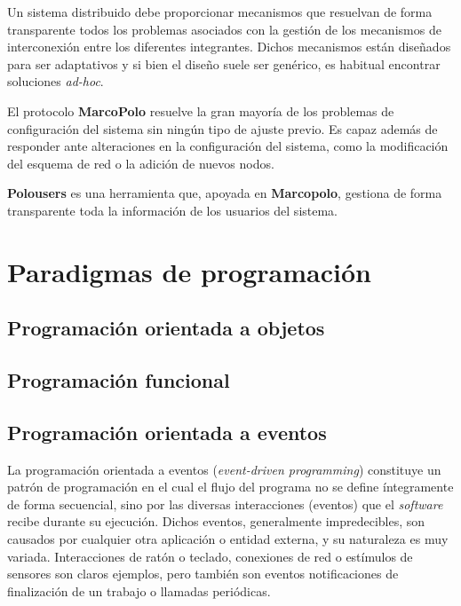 Un sistema distribuido debe proporcionar mecanismos que resuelvan de forma transparente todos los problemas asociados con la gestión de los mecanismos de interconexión entre los diferentes integrantes. Dichos mecanismos están diseñados para ser adaptativos y si bien el diseño suele ser genérico, es habitual encontrar soluciones \textit{ad-hoc}.


El protocolo \textbf{MarcoPolo} resuelve la gran mayoría de los problemas de configuración del sistema sin ningún tipo de ajuste previo. Es capaz además de responder ante alteraciones en la configuración del sistema, como la modificación del esquema de red o la adición de nuevos nodos.

\textbf{Polousers} es una herramienta que, apoyada en \textbf{Marcopolo}, gestiona de forma transparente toda la información de los usuarios del sistema.

\section{Paradigmas de programación}

\subsection{Programación orientada a objetos}

\subsection{Programación funcional}

\subsection{Programación orientada a eventos}
\label{teoria:eventdriven}

La programación orientada a eventos (\textit{event-driven programming}) constituye un patrón de programación en el cual el flujo del programa no se define íntegramente de forma secuencial, sino por las diversas interacciones (eventos) que el \textit{software} recibe durante su ejecución. Dichos eventos, generalmente impredecibles, son causados por cualquier otra aplicación o entidad externa, y su naturaleza es muy variada. Interacciones de ratón o teclado, conexiones de red o estímulos de sensores son claros ejemplos, pero también son eventos notificaciones de finalización de un trabajo o llamadas periódicas.

